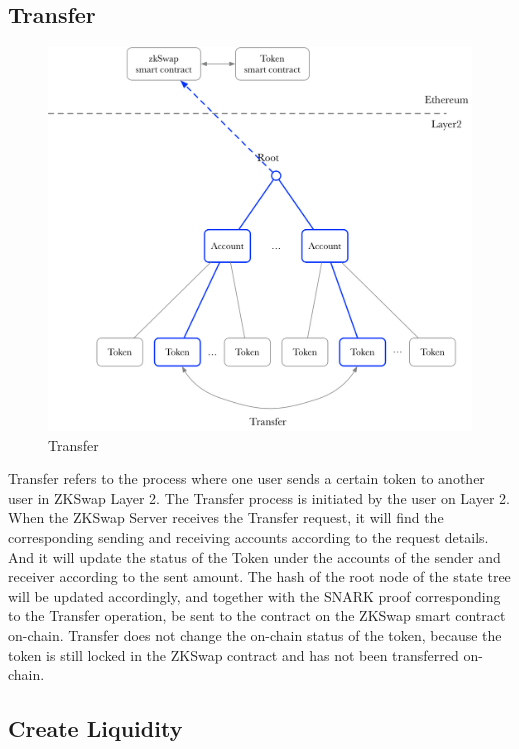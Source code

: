 \documentclass[]{template/llncs}
\begin{document}
\subsection{Transfer}

\begin{figure}[htbp]
\centering
\includegraphics[width=0.9\columnwidth]{figure/transfer}
\caption{Transfer}
\label{fig:transfer}
\end{figure}

Transfer refers to the process where one user sends a certain token to another user in ZKSwap Layer 2. The Transfer process is initiated by the user on Layer 2. When the ZKSwap Server receives the Transfer request, it will find the corresponding sending and receiving accounts according to the request details.
And it will update the status of the Token under the accounts of the sender and receiver according to the sent amount. The hash of the root node of the state tree will be updated accordingly, and together with the SNARK proof corresponding to the Transfer operation, be sent to the contract on the ZKSwap smart contract on-chain. Transfer does not change the on-chain status of the token, because the token is still locked in the ZKSwap contract and has not been transferred on-chain.


\subsection{Create Liquidity}
\end{document}
